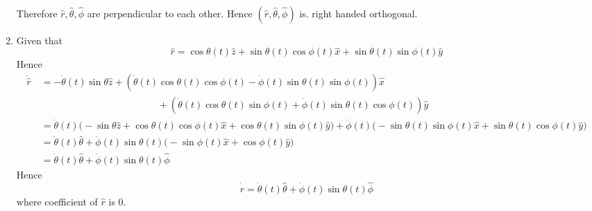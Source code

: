 \documentclass{article}
\begin{document}
\begin{enumerate}
\begin{align*}
\end{align*}
Therefore $\hat{r},\hat{\theta},\hat{\phi}$ are perpendicular to each other. Hence $(\hat{r},\hat{\theta},\hat{\phi})$ is. right handed orthogonal.
\item Given that$$\hat{r}=\cos \theta(t) \hat{z}+\sin \theta(t)\cos \phi(t) \hat{x}+\sin \theta(t)\sin \phi(t) \hat{y}$$Hence \begin{align*}
	\dot{\hat{r}}\ &=-\dot{\theta}(t)\sin \theta \hat{z}+(\dot{\theta}(t)\cos\theta(t)\cos\phi(t)-\dot{\phi}(t)\sin\theta(t)\sin\phi(t))\hat{x}\\
	&\qquad\qquad\qquad\qquad\qquad\qquad+(\dot{\theta}(t)\cos\theta(t)\sin\phi(t)+\dot{\phi}(t)\sin\theta(t)\cos\phi(t))\hat{y}\\
	&=\dot{\theta}(t)\big(-\sin \theta \hat{z}+\cos\theta(t)\cos\phi(t)\hat{x}+\cos\theta(t)\sin\phi(t)\hat{y}\big)+\dot{\phi}(t)\big(-\sin\theta(t)\sin\phi(t)\hat{x}+\sin\theta(t)\cos\phi(t)\hat{y}\big)\\
	&=\dot{\theta}(t)\hat{\theta}+\dot{\phi}(t)\sin\theta(t)\big(-\sin\phi(t)\hat{x}+\cos\phi(t)\hat{y}\big)\\
	&=\dot{\theta}(t)\hat{\theta}+\dot{\phi}(t)\sin\theta(t)\hat{\phi}
\end{align*}
Hence$$\dot{\hat{r}}=\dot{\theta}(t)\hat{\theta}+\dot{\phi}(t)\sin\theta(t)\hat{\phi}$$ where coefficient of $\hat{r}$ is 0.
\end{enumerate}
\end{document}
